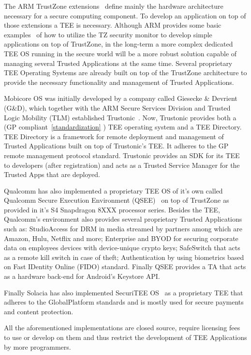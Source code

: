 \documentclass[cameraready]{cseminar}
\begin{document}
The ARM TrustZone extensions~\cite{trustzonewhitepaper} define mainly the hardware architecture necessary for a secure computing component. To develop an application on top of those extensions a TEE is necessary. Although ARM provides some basic examples~\cite{trustzoneexample} of how to utilize the TZ security monitor to develop simple applications on top of TrustZone, in the long-term a more complex dedicated TEE OS running in the secure world will be a more robust solution capable of managing several Trusted Applications at the same time. Several proprietary TEE Operating Systems are already built on top of the TrustZone architecture to provide the necessary functionality and management of Trusted Applications. 

Mobicore OS was initially developed by a company called Giesecke \& Devrient (G\&D), which together with the ARM Secure Services Division and Trusted Logic Mobility (TLM)  established Trustonic~\cite{trustonic}. Now, Trustonic provides both a (GP compliant~\ref{standardization} ) TEE operating system and a TEE Directory. TEE Directory is a framework for remote deployment and management of Trusted Applications built on top of Trustonic's TEE. It adheres to the GP remote management protocol standard. Trustonic provides an SDK for its TEE to developers (after registration) and acts as a Trusted Service Manager for the Trusted Apps that are deployed.

Qualcomm has also implemented a proprietary TEE OS of it's own called Qualcomm Secure Execution Environment (QSEE)~\cite{qualcommqsee} on top of TrustZone as provided in it's S4 Snapdragon 8XXX processor series. Besides the TEE, Qualcomm's environment also provides several proprietary Trusted Applications such as: StudioAccess for DRM in media streamed by partners among which are Amazon, Hulu, Netflix and more; Enterprise and BYOD for securing corporate data on employees devices with device-unique crypto keys; SafeSwitch that acts as a remote kill switch in case of theft; Authentication by using biometrics based on Fast IDentity Online (FIDO) standard. Finally QSEE provides a TA that acts as a hardware back-end for Android's Keystore API. 

Finally Solacia has also implemented SecuriTEE OS~\cite{solaciatee} as a proprietary TEE that adheres to the GlobalPlatform standards and is mostly used for secure payments and content protection.

All the aforementioned implementations are closed source, require licensing fees to use or develop on them and thus restrict the development of TEE Applications by more programmers. 
\end{document}
